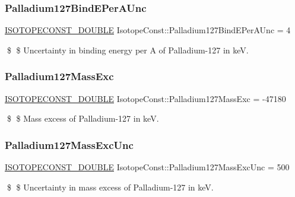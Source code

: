 \subsubsection{\texorpdfstring{Palladium127\+Bind\+E\+Per\+A\+Unc}{Palladium127BindEPerAUnc}}
{\footnotesize\ttfamily \mbox{\hyperlink{group___isotope_const-_macros_ga8f45a7272ce02c0b4c65c44636ed719a}{I\+S\+O\+T\+O\+P\+E\+C\+O\+N\+S\+T\+\_\+\+D\+O\+U\+B\+LE}} Isotope\+Const\+::\+Palladium127\+Bind\+E\+Per\+A\+Unc = 4}

\$ \$ Uncertainty in binding energy per A of Palladium-\/127 in keV. \mbox{\label{group___isotope_const-_palladium-_pd127_ga481588eadde33ee309636d2af3c76c0c}} 
\subsubsection{\texorpdfstring{Palladium127\+Mass\+Exc}{Palladium127MassExc}}
{\footnotesize\ttfamily \mbox{\hyperlink{group___isotope_const-_macros_ga8f45a7272ce02c0b4c65c44636ed719a}{I\+S\+O\+T\+O\+P\+E\+C\+O\+N\+S\+T\+\_\+\+D\+O\+U\+B\+LE}} Isotope\+Const\+::\+Palladium127\+Mass\+Exc = -\/47180}

\$ \$ Mass excess of Palladium-\/127 in keV. \mbox{\label{group___isotope_const-_palladium-_pd127_ga1de40f174eea39f422109c5c440a6d8d}} 
\subsubsection{\texorpdfstring{Palladium127\+Mass\+Exc\+Unc}{Palladium127MassExcUnc}}
{\footnotesize\ttfamily \mbox{\hyperlink{group___isotope_const-_macros_ga8f45a7272ce02c0b4c65c44636ed719a}{I\+S\+O\+T\+O\+P\+E\+C\+O\+N\+S\+T\+\_\+\+D\+O\+U\+B\+LE}} Isotope\+Const\+::\+Palladium127\+Mass\+Exc\+Unc = 500}

\$ \$ Uncertainty in mass excess of Palladium-\/127 in keV. \mbox{\label{group___isotope_const-_palladium-_pd127_gabd77b8ae58b832a49ea779b227557d4d}} 

